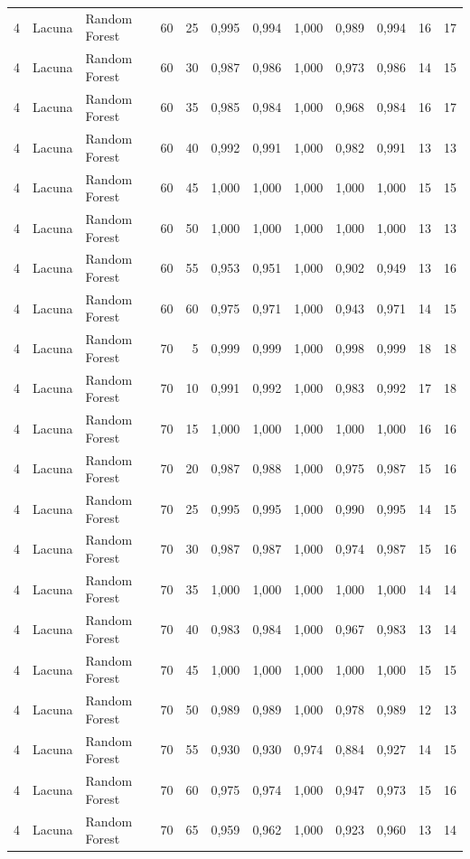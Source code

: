 \begin{longtable}{@{}rllrrrrrrrrr@{}}
4 & Lacuna & Random Forest & 60 & 25 & 0,995 & 0,994 & 1,000 & 0,989 & 0,994 & 16 & 17 \\
4 & Lacuna & Random Forest & 60 & 30 & 0,987 & 0,986 & 1,000 & 0,973 & 0,986 & 14 & 15 \\
4 & Lacuna & Random Forest & 60 & 35 & 0,985 & 0,984 & 1,000 & 0,968 & 0,984 & 16 & 17 \\
4 & Lacuna & Random Forest & 60 & 40 & 0,992 & 0,991 & 1,000 & 0,982 & 0,991 & 13 & 13 \\
4 & Lacuna & Random Forest & 60 & 45 & 1,000 & 1,000 & 1,000 & 1,000 & 1,000 & 15 & 15 \\
4 & Lacuna & Random Forest & 60 & 50 & 1,000 & 1,000 & 1,000 & 1,000 & 1,000 & 13 & 13 \\
4 & Lacuna & Random Forest & 60 & 55 & 0,953 & 0,951 & 1,000 & 0,902 & 0,949 & 13 & 16 \\
4 & Lacuna & Random Forest & 60 & 60 & 0,975 & 0,971 & 1,000 & 0,943 & 0,971 & 14 & 15 \\
4 & Lacuna & Random Forest & 70 & 5 & 0,999 & 0,999 & 1,000 & 0,998 & 0,999 & 18 & 18 \\
4 & Lacuna & Random Forest & 70 & 10 & 0,991 & 0,992 & 1,000 & 0,983 & 0,992 & 17 & 18 \\
4 & Lacuna & Random Forest & 70 & 15 & 1,000 & 1,000 & 1,000 & 1,000 & 1,000 & 16 & 16 \\
4 & Lacuna & Random Forest & 70 & 20 & 0,987 & 0,988 & 1,000 & 0,975 & 0,987 & 15 & 16 \\
4 & Lacuna & Random Forest & 70 & 25 & 0,995 & 0,995 & 1,000 & 0,990 & 0,995 & 14 & 15 \\
4 & Lacuna & Random Forest & 70 & 30 & 0,987 & 0,987 & 1,000 & 0,974 & 0,987 & 15 & 16 \\
4 & Lacuna & Random Forest & 70 & 35 & 1,000 & 1,000 & 1,000 & 1,000 & 1,000 & 14 & 14 \\
4 & Lacuna & Random Forest & 70 & 40 & 0,983 & 0,984 & 1,000 & 0,967 & 0,983 & 13 & 14 \\
4 & Lacuna & Random Forest & 70 & 45 & 1,000 & 1,000 & 1,000 & 1,000 & 1,000 & 15 & 15 \\
4 & Lacuna & Random Forest & 70 & 50 & 0,989 & 0,989 & 1,000 & 0,978 & 0,989 & 12 & 13 \\
4 & Lacuna & Random Forest & 70 & 55 & 0,930 & 0,930 & 0,974 & 0,884 & 0,927 & 14 & 15 \\
4 & Lacuna & Random Forest & 70 & 60 & 0,975 & 0,974 & 1,000 & 0,947 & 0,973 & 15 & 16 \\
4 & Lacuna & Random Forest & 70 & 65 & 0,959 & 0,962 & 1,000 & 0,923 & 0,960 & 13 & 14 \\

\end{longtable}
